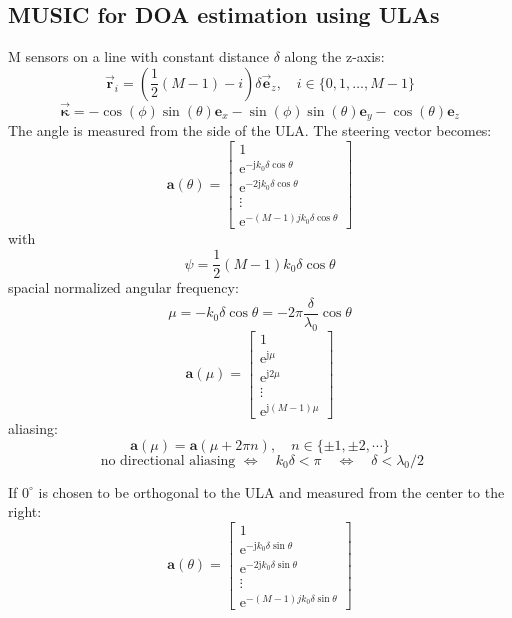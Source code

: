 \documentclass[english]{latex4ei/latex4ei_sheet}
\begin{document}
\begin{sectionbox}
  \subsection{MUSIC for DOA estimation using ULAs}
  M sensors on a line with constant distance $\delta$ along the z-axis:
  $$\overrightarrow{\boldsymbol{r}}_{i}=\left(\frac{1}{2}(M-1)-i\right) \delta \overrightarrow{\mathbf{e}}_{z}, \quad i \in\{0,1, \ldots, M-1\}$$
  $$\overrightarrow{\boldsymbol{\kappa}}=-\cos (\phi) \sin (\theta) \mathbf{e}_{x}-\sin (\phi) \sin (\theta) \mathbf{e}_{y}-\cos (\theta) \mathbf{e}_{z}$$
  The angle is measured from the side of the ULA.
  The steering vector becomes:
  $$\boldsymbol{a}(\theta)=\left[\begin{array}{c}
    1 \\
    \mathrm{e}^{-\mathrm{j} k_{0} \delta \cos \theta} \\
    \mathrm{e}^{-2 \mathrm{j} k_{0} \delta \cos \theta} \\
    \vdots \\
    \mathrm{e}^{-(M-1) j k_{0} \delta \cos \theta}
    \end{array}\right]$$
  with
  $$\psi=\frac{1}{2}(M-1) k_{0} \delta \cos \theta$$
  spacial normalized angular frequency:
  $$\mu=-k_{0} \delta \cos \theta=-2 \pi \frac{\delta}{\lambda_{0}} \cos \theta$$
  $$\boldsymbol{a}(\mu)=\left[\begin{array}{c}
    1 \\
    \mathrm{e}^{\mathrm{j} \mu} \\
    \mathrm{e}^{\mathrm{j} 2 \mu} \\
    \vdots \\
    \mathrm{e}^{\mathrm{j}(M-1) \mu}
    \end{array}\right]$$
aliasing:
    $$\boldsymbol{a}(\mu)=\boldsymbol{a}(\mu+2 \pi n), \quad n \in\{\pm 1, \pm 2, \cdots\}$$
    $$\text { no directional aliasing } \Longleftrightarrow \quad k_{0} \delta<\pi \quad \Longleftrightarrow \quad \delta<\lambda_{0} / 2$$

    If $0^{\circ}$ is chosen to be orthogonal to the ULA and measured from the center to the right:
    $$\boldsymbol{a}(\theta)=\left[\begin{array}{c}
      1 \\
      \mathrm{e}^{-\mathrm{j} k_{0} \delta \sin \theta} \\
      \mathrm{e}^{-2 \mathrm{j} k_{0} \delta \sin \theta} \\
      \vdots \\
      \mathrm{e}^{-(M-1) j k_{0} \delta \sin \theta}
      \end{array}\right]$$
\end{sectionbox}
\end{document}
